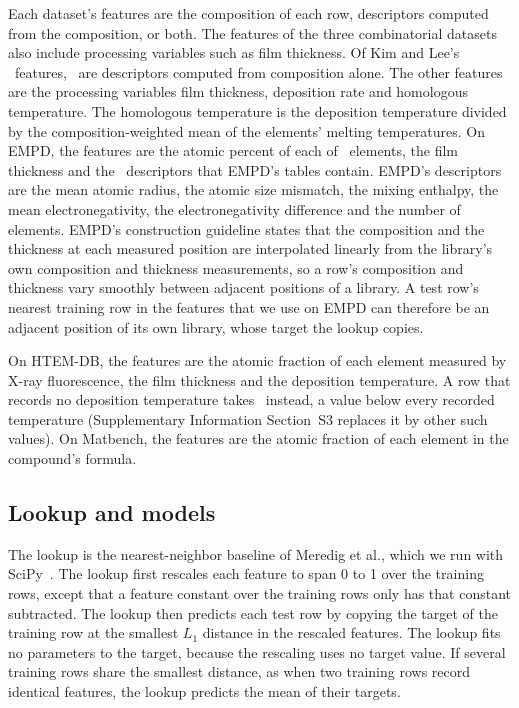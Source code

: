 \documentclass[11pt]{article}
\begin{document}
Each dataset's features are the composition of each row, descriptors computed
from the composition, or both. The features of the three combinatorial datasets
also include processing variables such as film thickness.
Of Kim and Lee's \npjFeatureCount\ features,
\npjCompositionFeatureCount\ are descriptors computed from composition alone. The
other features are the processing variables film thickness, deposition rate
and homologous temperature. The homologous temperature is the deposition temperature divided by the
composition-weighted mean of the elements' melting temperatures. On EMPD, the features are the atomic percent of each of \empdElementCount\ elements, the
film thickness and the \empdDescriptorCount\ descriptors that EMPD's tables
contain. EMPD's descriptors are the mean atomic radius, the atomic size mismatch, the mixing
enthalpy, the mean electronegativity, the electronegativity difference and the
number of elements. EMPD's construction guideline states that the composition and the thickness at
each measured position are interpolated linearly from the library's own
composition and thickness measurements,\cite{aihubGuideline} so a row's
composition and thickness vary smoothly between adjacent positions of a
library. A test row's nearest training row in the features that we use on EMPD
can therefore be
an adjacent position of its own library, whose target the lookup copies.

On HTEM-DB, the features are the atomic fraction of each element measured by
X-ray fluorescence, the film thickness and the deposition temperature. A row
that records no deposition temperature takes \htemNoTemperature\ instead, a
value below every recorded temperature (Supplementary Information Section~S3
replaces it by other such values). On Matbench, the features are the atomic
fraction of each element in the compound's formula.

\subsection*{Lookup and models}
\label{sec:predictors}

The lookup is the nearest-neighbor baseline of Meredig et
al.,\cite{meredig2018extrapolation} which we run with
SciPy~\scipyVersion.\cite{virtanen2020scipy} The lookup first rescales each
feature to span 0 to 1 over the training rows, except that a feature constant
over the training rows only has that constant subtracted. The lookup then predicts each
test row by copying the target of the training row at the smallest $L_1$
distance in the rescaled features. The lookup fits no parameters to the
target, because the rescaling uses no target value. If several training
rows share the smallest distance, as when two training rows record identical
features, the lookup predicts the mean of their targets.
\end{document}
